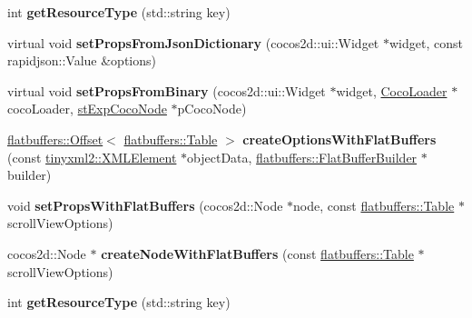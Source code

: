 \begin{DoxyCompactItemize}
int {\bfseries get\+Resource\+Type} (std\+::string key)
\item 
\mbox{\label{classcocostudio_1_1ScrollViewReader_a7bd07d4c27480476938e425860979a1d}} 
virtual void {\bfseries set\+Props\+From\+Json\+Dictionary} (cocos2d\+::ui\+::\+Widget $\ast$widget, const rapidjson\+::\+Value \&options)
\item 
\mbox{\label{classcocostudio_1_1ScrollViewReader_a409ffe7b59af68235b9ea6cfa1541384}} 
virtual void {\bfseries set\+Props\+From\+Binary} (cocos2d\+::ui\+::\+Widget $\ast$widget, \hyperlink{classcocostudio_1_1CocoLoader}{Coco\+Loader} $\ast$coco\+Loader, \hyperlink{structcocostudio_1_1stExpCocoNode}{st\+Exp\+Coco\+Node} $\ast$p\+Coco\+Node)
\item 
\mbox{\label{classcocostudio_1_1ScrollViewReader_af2ce7da8e6cf00c4676ba9e2ebe460b7}} 
\hyperlink{structflatbuffers_1_1Offset}{flatbuffers\+::\+Offset}$<$ \hyperlink{classflatbuffers_1_1Table}{flatbuffers\+::\+Table} $>$ {\bfseries create\+Options\+With\+Flat\+Buffers} (const \hyperlink{classtinyxml2_1_1XMLElement}{tinyxml2\+::\+X\+M\+L\+Element} $\ast$object\+Data, \hyperlink{classflatbuffers_1_1FlatBufferBuilder}{flatbuffers\+::\+Flat\+Buffer\+Builder} $\ast$builder)
\item 
\mbox{\label{classcocostudio_1_1ScrollViewReader_a9b510f16bb5621cd7eea4e51cfeac8f3}} 
void {\bfseries set\+Props\+With\+Flat\+Buffers} (cocos2d\+::\+Node $\ast$node, const \hyperlink{classflatbuffers_1_1Table}{flatbuffers\+::\+Table} $\ast$scroll\+View\+Options)
\item 
\mbox{\label{classcocostudio_1_1ScrollViewReader_ab2f30f4a5b54a24e32de80b66244cd97}} 
cocos2d\+::\+Node $\ast$ {\bfseries create\+Node\+With\+Flat\+Buffers} (const \hyperlink{classflatbuffers_1_1Table}{flatbuffers\+::\+Table} $\ast$scroll\+View\+Options)
\item 
\mbox{\label{classcocostudio_1_1ScrollViewReader_adb643e987ee5d83ca756fc3d8923a92a}} 
int {\bfseries get\+Resource\+Type} (std\+::string key)
\end{DoxyCompactItemize}
